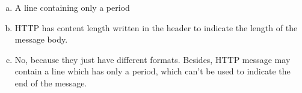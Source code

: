 \begin{pr}$ $
\begin{enumerate}[a.]
\item A line containing only a period
\item HTTP has content length written in the header to indicate the length of the message body.
\item No, because they just have different formats. Besides, HTTP message may contain a line which has only a period, which can't be used to indicate the end of the message.
\end{enumerate}
\end{pr}
